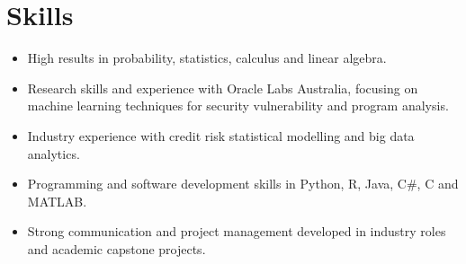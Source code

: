 \section*{Skills}

\begin{itemize}
    \setlength\itemsep{0.1em}
    \item High results in probability, statistics, calculus and linear algebra.
    \item Research skills and experience with Oracle Labs Australia, focusing on machine learning techniques for security vulnerability and program analysis.
    \item Industry experience with credit risk statistical modelling and big data analytics.
    \item Programming and software development skills in Python, R, Java, C\#, C and MATLAB.
    \item Strong communication and project management developed in industry roles and academic capstone projects.
\end{itemize}